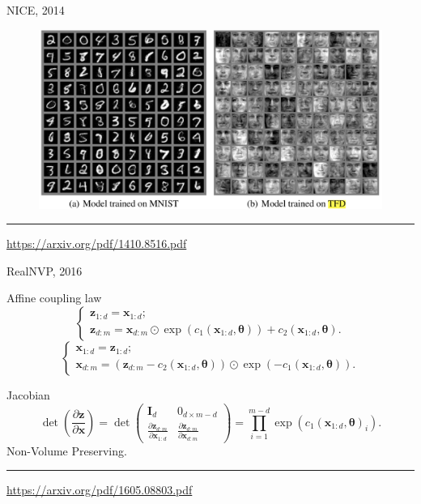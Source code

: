 \documentclass{beamer}
\newcommand{\bx}{\mathbf{x}}
\newcommand{\bz}{\mathbf{z}}
\newcommand{\bI}{\mathbf{I}}
\newcommand{\btheta}{\boldsymbol{\theta}}
\begin{document}
\begin{frame}{NICE, 2014}
	\begin{figure}
		\centering
		\includegraphics[width=\linewidth]{figs/nice.png}
	\end{figure}
	\vfill
	\hrule\medskip
	{\scriptsize \href{https://arxiv.org/pdf/1410.8516.pdf}{https://arxiv.org/pdf/1410.8516.pdf}} 
\end{frame}
\begin{frame}{RealNVP, 2016}
	\begin{block}{Affine coupling law}
		\[
		\begin{cases} \bz_{1:d} = \bx_{1:d}; \\ \bz_{d:m} = \bx_{d:m} \odot \exp \left(c_1(\bx_{1:d}, \btheta)\right) + c_2(\bx_{1:d}, \btheta).\end{cases} 
		\]
		\[
		\begin{cases} \bx_{1:d} = \bz_{1:d}; \\ \bx_{d:m} = \left(\bz_{d:m} - c_2(\bx_{1:d}, \btheta) \right) \odot \exp(-c_1(\bx_{1:d}, \btheta)).\end{cases}
		\]
	\end{block}
	\begin{block}{Jacobian}
		\vspace{-0.3cm}
		\[
		\det \left( \frac{\partial \bz}{\partial \bx} \right) = \det 
		\begin{pmatrix}
			\bI_d & 0_{d \times m - d} \\
			\frac{\partial \bz_{d:m}}{\partial \bx_{1:d}} & \frac{\partial \bz_{d:m}}{\partial \bx_{d:m}}
		\end{pmatrix} = \prod_{i=1}^{m - d} \exp (c_1(\bx_{1:d}, \btheta)_i).
		\]
		Non-Volume Preserving.
	\end{block}
	\vfill
	\hrule\medskip
	{\scriptsize \href{https://arxiv.org/pdf/1605.08803.pdf}{https://arxiv.org/pdf/1605.08803.pdf}} 
\end{frame}
\end{document}

